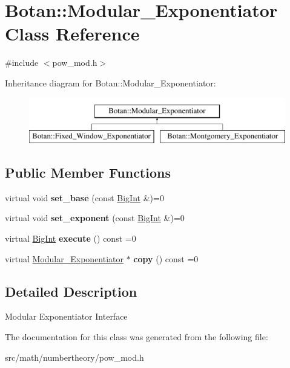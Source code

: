 \hypertarget{classBotan_1_1Modular__Exponentiator}{\section{Botan\-:\-:Modular\-\_\-\-Exponentiator Class Reference}
\label{classBotan_1_1Modular__Exponentiator}
}


{\ttfamily \#include $<$pow\-\_\-mod.\-h$>$}

Inheritance diagram for Botan\-:\-:Modular\-\_\-\-Exponentiator\-:\begin{figure}[H]
\begin{center}
\leavevmode
\includegraphics[height=2.000000cm]{classBotan_1_1Modular__Exponentiator}
\end{center}
\end{figure}
\subsection*{Public Member Functions}
\begin{DoxyCompactItemize}
\item 
\hypertarget{classBotan_1_1Modular__Exponentiator_ad7f0dad6ee8e357a7f57513d7375995a}{virtual void {\bfseries set\-\_\-base} (const \hyperlink{classBotan_1_1BigInt}{Big\-Int} \&)=0}\label{classBotan_1_1Modular__Exponentiator_ad7f0dad6ee8e357a7f57513d7375995a}

\item 
\hypertarget{classBotan_1_1Modular__Exponentiator_a26c43635b166651e25112b82139c2255}{virtual void {\bfseries set\-\_\-exponent} (const \hyperlink{classBotan_1_1BigInt}{Big\-Int} \&)=0}\label{classBotan_1_1Modular__Exponentiator_a26c43635b166651e25112b82139c2255}

\item 
\hypertarget{classBotan_1_1Modular__Exponentiator_a5c3417987b1332e0e4ae7852a40a8e1d}{virtual \hyperlink{classBotan_1_1BigInt}{Big\-Int} {\bfseries execute} () const =0}\label{classBotan_1_1Modular__Exponentiator_a5c3417987b1332e0e4ae7852a40a8e1d}

\item 
\hypertarget{classBotan_1_1Modular__Exponentiator_aa91a70006617143ce702049e55f48df3}{virtual \hyperlink{classBotan_1_1Modular__Exponentiator}{Modular\-\_\-\-Exponentiator} $\ast$ {\bfseries copy} () const =0}\label{classBotan_1_1Modular__Exponentiator_aa91a70006617143ce702049e55f48df3}

\end{DoxyCompactItemize}


\subsection{Detailed Description}
Modular Exponentiator Interface 

The documentation for this class was generated from the following file\-:\begin{DoxyCompactItemize}
\item 
src/math/numbertheory/pow\-\_\-mod.\-h\end{DoxyCompactItemize}
